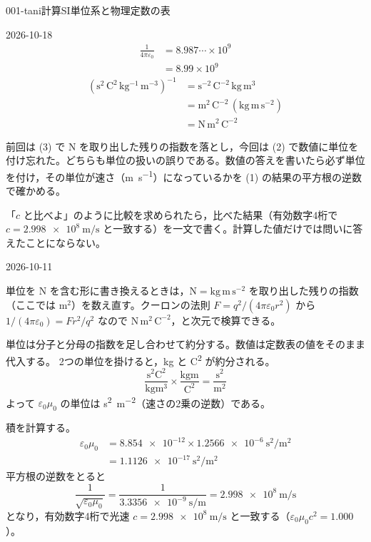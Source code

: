 \documentclass[uplatex,dvipdfmx,a4paper,11pt]{jsarticle}
\begin{document}
\begin{mondai}{001-tani}{計算}{SI単位系と物理定数の表}
\begin{kotaeutsushi}{2026-10-18}
\begin{align*}
\frac{1}{4\pi\varepsilon_{0}}&=8.987\cdots\times10^{9}\\
&=8.99\times10^{9}
\end{align*}
\begin{align*}
(\mathrm{s^{2}\,C^{2}\,kg^{-1}\,m^{-3}})^{-1}&=\mathrm{s^{-2}\,C^{-2}\,kg\,m^{3}}\\
&=\mathrm{m^{2}\,C^{-2}}\,(\mathrm{kg\,m\,s^{-2}})\\
&=\mathrm{N\,m^{2}\,C^{-2}}
\end{align*}
\end{kotaeutsushi}
\begin{kizuki}
\item {} 前回は (3) で \unit{\newton} を取り出した残りの指数を落とし，今回は (2) で数値に単位を付け忘れた。どちらも単位の扱いの誤りである。数値の答えを書いたら必ず単位を付け，その単位が速さ（\unit{\metre\per\second}）になっているかを (1) の結果の平方根の逆数で確かめる。
\item 「$c$ と比べよ」のように比較を求められたら，比べた結果（有効数字4桁で $c=\qty{2.998e8}{\metre\per\second}$ と一致する）を一文で書く。計算した値だけでは問いに答えたことにならない。
\end{kizuki}
\begin{maekizuki}{2026-10-11}
\item 単位を \unit{\newton} を含む形に書き換えるときは，$\unit{\newton}=\mathrm{kg\,m\,s^{-2}}$ を取り出した残りの指数（ここでは $\mathrm{m^{2}}$）を数え直す。クーロンの法則 $F=q^{2}/(4\pi\varepsilon_{0}r^{2})$ から $1/(4\pi\varepsilon_{0})=Fr^{2}/q^{2}$ なので $\mathrm{N\,m^{2}\,C^{-2}}$，と次元で検算できる。
\end{maekizuki}
\begin{tadashii}
\houshin 単位は分子と分母の指数を足し合わせて約分する。数値は定数表の値をそのまま代入する。
\keisan {} 2つの単位を掛けると，\unit{\kilogram} と \unit{\coulomb\squared} が約分される。
\[ \frac{\unit{\second\squared\coulomb\squared}}{\unit{\kilogram\metre\cubed}}\times\frac{\unit{\kilogram\metre}}{\unit{\coulomb\squared}} = \frac{\unit{\second\squared}}{\unit{\metre\squared}} \]
よって $\varepsilon_0\mu_0$ の単位は \unit{\second\squared\per\metre\squared}（速さの2乗の逆数）である。

 積を計算する。
\begin{align*}
  \varepsilon_0\mu_0 &= \num{8.854e-12}\times\num{1.2566e-6}\ \unit{\second\squared\per\metre\squared} \\
  &= \qty{1.1126e-17}{\second\squared\per\metre\squared}
\end{align*}
平方根の逆数をとると
\[ \frac{1}{\sqrt{\varepsilon_0\mu_0}} = \frac{1}{\qty{3.3356e-9}{\second\per\metre}} = \qty{2.998e8}{\metre\per\second} \]
となり，有効数字4桁で光速 $c = \qty{2.998e8}{\metre\per\second}$ と一致する（$\varepsilon_0\mu_0c^2 = \num{1.000}$）。


\end{tadashii}
\end{mondai}
\end{document}
